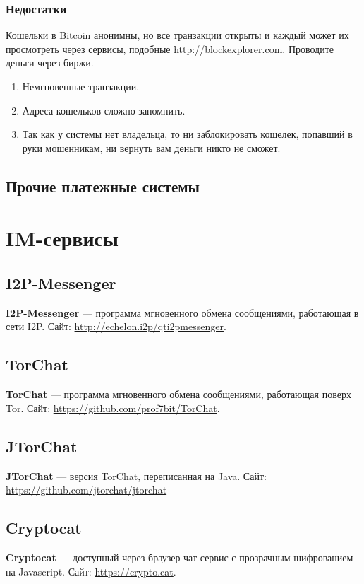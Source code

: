 \subsubsection{Недостатки}
\begin{important}
Кошельки в Bitcoin анонимны, но все транзакции открыты и каждый может их просмотреть через сервисы, подобные \url{http://blockexplorer.com}. Проводите деньги через биржи.
\end{important}
\begin{enumerate}
\item Немгновенные транзакции.
\item Адреса кошельков сложно запомнить.
\item Так как у системы нет владельца, то ни заблокировать кошелек, попавший в руки мошенникам, ни вернуть вам деньги никто не сможет.
\end{enumerate}
\subsection{Прочие платежные системы}

\section{IM-сервисы}
\subsection{I2P-Messenger}
\textbf{I2P-Messenger} --- программа мгновенного обмена сообщениями, работающая в сети I2P. Сайт: \url{http://echelon.i2p/qti2pmessenger}.
\subsection{TorChat}
\textbf{TorChat} --- программа мгновенного обмена сообщениями, работающая поверх Tor. Сайт: \url{https://github.com/prof7bit/TorChat}.
\subsection{JTorChat}
\textbf{JTorChat} --- версия TorChat, переписанная на Java. Сайт: \url{https://github.com/jtorchat/jtorchat}
\subsection{Cryptocat}
\textbf{Cryptocat} --- доступный через браузер чат-сервис с прозрачным шифрованием на Javascript. Сайт: \url{https://crypto.cat}.

